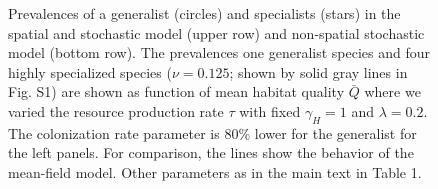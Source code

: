\documentclass[8pt,a4paper]{article}
\begin{document}
\begin{figure}
\begin{center}
\caption{
	Prevalences of a generalist (circles) and specialists (stars) in the spatial and stochastic model (upper row) and non-spatial stochastic model (bottom row).
	The prevalences one generalist species and four highly specialized species ($\nu = 0.125$; shown by solid gray lines in Fig. S1) are shown as function of mean habitat quality 				   $\bar{Q}$ where we varied the resource production rate $\tau$ with fixed $\gamma_H=1$ and $\lambda =0.2$. 
    The colonization rate parameter is $80\%$ lower for the generalist for the left panels. For comparison, the lines show the behavior of the mean-field model. Other parameters as in the main text in  Table 1.
}%
\label{FigS1}
\end{center}
\end{figure}
\end{document}
